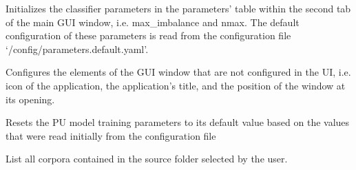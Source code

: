 \documentclass[letterpaper,10pt,english]{sphinxmanual}
\begin{document}
\begin{fulllineitems}
\begin{fulllineitems}
\label{\detokenize{gui_main_window:src.graphical_user_interface.main_window.MainWindow.init_params_train_pu_model}}
\sphinxAtStartPar
Initializes the classifier parameters in the parameters’ table within the second tab of the main GUI
window, i.e. max\_imbalance and nmax. The default configuration of these parameters is read from the
configuration file ‘/config/parameters.default.yaml’.

\end{fulllineitems}


\begin{fulllineitems}
\label{\detokenize{gui_main_window:src.graphical_user_interface.main_window.MainWindow.init_ui}}
\sphinxAtStartPar
Configures the elements of the GUI window that are not configured in the UI, i.e. icon of the application,
the application’s title, and the position of the window at its opening.

\end{fulllineitems}


\begin{fulllineitems}
\label{\detokenize{gui_main_window:src.graphical_user_interface.main_window.MainWindow.reset_params_train_pu_model}}
\sphinxAtStartPar
Resets the PU model training parameters to its default value based on the values
that were read initially from the configuration file

\end{fulllineitems}


\begin{fulllineitems}
\label{\detokenize{gui_main_window:src.graphical_user_interface.main_window.MainWindow.show_corpora}}
\sphinxAtStartPar
List all corpora contained in the source folder selected by the user.


\end{fulllineitems}
\end{fulllineitems}
\end{document}

